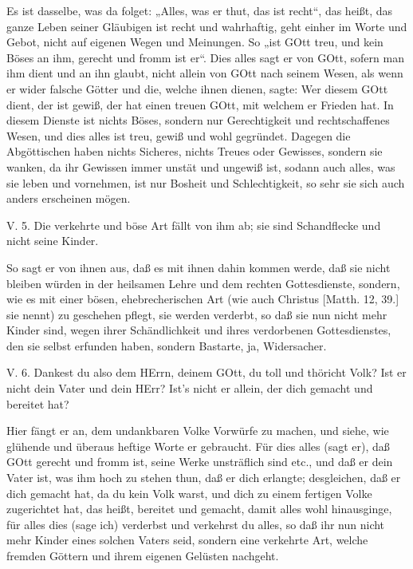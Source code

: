 Es ist dasselbe, was da folget: „Alles, was er thut, das ist recht“, das heißt, das ganze Leben seiner Gläubigen ist recht und wahrhaftig, geht einher im Worte und Gebot, nicht auf eigenen Wegen und Meinungen. So „ist GOtt treu, und kein Böses an ihm, gerecht und fromm ist er“. Dies alles sagt er von GOtt, sofern man ihm dient und an ihn glaubt, nicht allein von GOtt nach seinem Wesen, als wenn er wider falsche Götter und die, welche ihnen dienen, sagte: Wer diesem GOtt dient, der ist gewiß, der hat einen treuen GOtt, mit welchem er Frieden hat. In diesem Dienste ist nichts Böses, sondern nur Gerechtigkeit und rechtschaffenes Wesen, und dies alles ist treu, gewiß und wohl gegründet. Dagegen die Abgöttischen haben nichts Sicheres, nichts Treues oder Gewisses, sondern sie wanken, da ihr Gewissen immer unstät und ungewiß ist, sodann auch alles, was sie leben und vornehmen, ist nur Bosheit und Schlechtigkeit, so sehr sie sich auch anders erscheinen mögen.

\begin{schriftzitat}
V. 5. Die verkehrte und böse Art fällt von ihm ab; sie sind Schandflecke und nicht seine Kinder.
\end{schriftzitat}

So sagt er von ihnen aus, daß es mit ihnen dahin kommen werde, daß sie nicht bleiben würden in der heilsamen Lehre und dem rechten Gottesdienste, sondern, wie es mit einer bösen, ehebrecherischen Art (wie auch Christus [Matth. 12, 39.] sie nennt) zu geschehen pflegt, sie werden verderbt, so daß sie nun nicht mehr Kinder sind, wegen ihrer Schändlichkeit und ihres verdorbenen Gottesdienstes, den sie selbst erfunden haben, sondern Bastarte, ja, Widersacher.

\begin{schriftzitat}
V. 6. Dankest du also dem HErrn, deinem GOtt, du toll und thöricht Volk? Ist er nicht dein Vater und dein HErr? Ist’s nicht er allein, der dich gemacht und bereitet hat?
\end{schriftzitat}

Hier fängt er an, dem undankbaren Volke Vorwürfe zu machen, und siehe, wie glühende und überaus heftige Worte er gebraucht. Für dies alles (sagt er), daß GOtt gerecht und fromm ist, seine Werke unsträflich sind etc., und daß er dein Vater ist, was ihm hoch zu stehen thun, daß er dich erlangte; desgleichen, daß er dich gemacht hat, da du kein Volk warst, und dich zu einem fertigen Volke zugerichtet hat, das heißt, bereitet und gemacht, damit alles wohl hinausginge, für alles dies (sage ich) verderbst und verkehrst du alles, so daß ihr nun nicht mehr Kinder eines solchen Vaters seid, sondern eine verkehrte Art, welche fremden Göttern und ihrem eigenen Gelüsten nachgeht.

